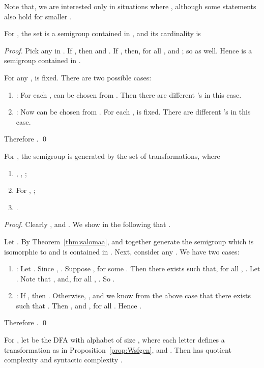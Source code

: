\documentclass{llncs}
\newcommand{\be}{\begin{enumerate}}
\newcommand{\ee}{\end{enumerate}}
\begin{document}
Note that, we are interested only in situations where , although some statements also hold for smaller . 


\begin{proposition}\label{prop:Wsf} 
For , the set  is a semigroup contained in , and its cardinality is 

\end{proposition}

\begin{proof} 
Pick any  in . If , then  and . If , then, for all ,  and ; so  as well. Hence  is a semigroup contained in . 

For any ,  is fixed. There are two possible cases: 
\be
\item : For each ,  can be chosen from . Then there are  different 's in this case. 
\item : Now  can be chosen from . For each ,  is fixed. There are  different 's in this case. 
\ee
Therefore . \qed
\end{proof}



\begin{proposition}\label{prop:Wsfgen} 
For , the semigroup  is generated by the set  of transformations, where 
\be 
\item , , ; 
\item For , ; 
\item . 
\ee 
\end{proposition}

\begin{proof} 
Clearly , and . We show in the following that . 

Let . By Theorem~\ref{thm:salomaa},  and  together generate the semigroup  which is isomorphic to  and is contained in . Next, consider any . We have two cases: 
\be 
\item : Let . Since , . Suppose , for some . Then there exists  such that, for all , . Let . Note that , and, for all , . So . 
\item : If , then . Otherwise, , and we know from the above case that there exists  such that . Then , and , for all . Hence . 
\ee 

Therefore . \qed
\end{proof}

\begin{theorem}\label{thm:wsfaut} 
For , let  be the DFA with alphabet  of size , where each letter defines a transformation as in Proposition~\ref{prop:Wsfgen}, and . Then  has quotient complexity  and syntactic complexity . 
\end{theorem}
\end{document}
